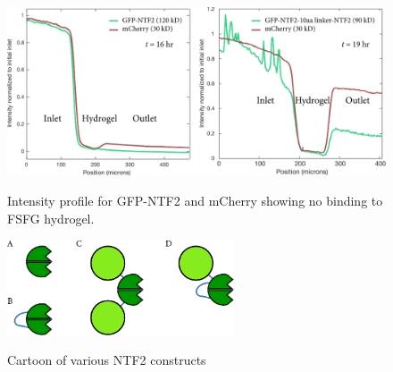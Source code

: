 \begin{figure} %
\caption{Intensity profile for GFP-NTF2 and mCherry showing no binding to FSFG hydrogel.}
\centering
\includegraphics[width=\textwidth]{figs/ch03/GFP-NTF2-attempts.pdf}
\label{fig:GFP-NTF2}
\end{figure} 

\begin{figure} %
\caption{Cartoon of various NTF2 constructs}
\centering
\includegraphics[width=0.6\textwidth]{figs/ch03/NTF2-constructs}
\label{fig:Kap121}
\end{figure}

